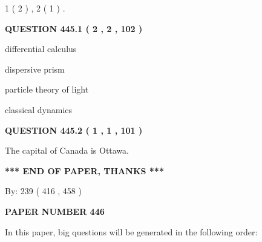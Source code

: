 \documentclass[12pt]{article}
\begin{document}
   
   1 ( 2 )
 ,
   2 ( 1 )
 .
  
\vspace{0.2in}
  
{\textbf{\Large{QUESTION
445.1 
 ( 2 , 2 , 102 )
}}}
  
  
 
 
\noindent{}
 
 
differential calculus
 
 
dispersive prism
 
 
particle theory of light
 
 
classical dynamics
 
 
 
 
  
\vspace{0.2in}
  
{\textbf{\Large{QUESTION
445.2 
 ( 1 , 1 , 101 )
}}}
  
  
 
 
\noindent{}
 
 
The capital of Canada is Ottawa.
 
 
 
 
   
   
\vspace{1.0in} 
{\textbf{\large{ *** END OF PAPER, THANKS *** }}} 
   
   
\hspace{1.0in} By: 
 239 ( 416 ,  458 )
   
   
   
   
\newpage 
\setcounter{page}{ 
   446001 } 
   
   
   
   
 {\textbf{ \Large{ PAPER NUMBER  446  }}}
   
   
\vspace{0.2in}
   
   
   
   
   
\vspace{0.2in}
   
In this paper, big questions will be generated in the following order: 
   
\end{document}
